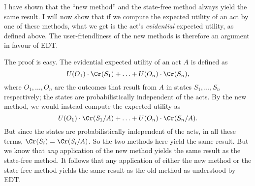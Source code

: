 I have shown that the ``new method'' and the state-free method always
yield the same result. I will now show that if we compute the expected
utility of an act by one of these methods, what we get is the act's
\emph{evidential} expected utility, as defined above. The
user-friendliness of the new methods is therefore an argument in
favour of EDT.

The proof is easy. The evidential expected utility of an act $A$ is
defined as
\[
U(O_1) \cdot \Cr(S_1) + \ldots + U(O_n) \cdot \Cr(S_n),
\]
where $O_1,\ldots,O_n$ are the outcomes that result from $A$ in states
$S_1,\ldots,S_n$ respectively; the states are probabilistically independent of
the acts. By the new method, we would instead compute the expected utility as
\[
U(O_1) \cdot \Cr(S_1/A) + \ldots + U(O_n) \cdot \Cr(S_n/A).
\]
But since the states are probabilistically independent of the acts, in
all these terms, $\Cr(S_i) = \Cr(S_i/A)$. So the two methods here
yield the same result. But we know that \emph{any} application of the
new method yields the same result as the state-free method. It follows
that any application of either the new method or the state-free method
yields the same result as the old method as understood by EDT.


